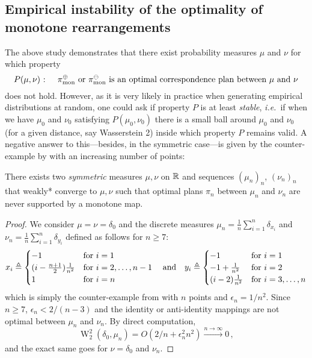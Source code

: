             \subsection{Empirical instability of the optimality of monotone rearrangements}
            \label{subsec:quadra1D_instability}
            The above study demonstrates that there exist probability measures $\mu$ and $\nu$ for which property
                \begin{equation*}
                    P(\mu,\nu)\text{ : }\quad \pi_\text{mon}^\oplus \text{ or } \pi_\text{mon}^\ominus \text{ is an optimal correspondence plan between }\mu\text{ and }\nu
                \end{equation*}
                does not hold. However, as it is very likely in practice when generating empirical distributions at random, one could ask if property $P$ is at least \emph{stable}, \textit{i.e.}~if when we have $\mu_0$ and $\nu_0$ satisfying $P(\mu_0,\nu_0)$ there is a small ball around $\mu_0$ and $\nu_0$ (for a given distance, say Wasserstein 2) inside which property $P$ remains valid. A negative answer to this---besides, in the symmetric case---is given by the counter-example by \cite{beinert2022assignment} with an increasing number of points:
                \begin{proposition}
                    \label{theo:no-stab}
                    There exists two \emph{symmetric} measures $\mu,\nu$ on $\mathbb{R}$ and sequences $(\mu_n)_n$, $(\nu_n)_n$ that weakly* converge to $\mu,\nu$ such that optimal plans $\pi_n$ between $\mu_n$ and $\nu_n$ are never supported by a monotone map.
                \end{proposition}
                \begin{proof}
                    We consider $\mu=\nu=\delta_0$ and the discrete measures $\mu_n=\frac{1}{n}\sum_{i=1}^n\delta_{x_i}$ and $\nu_n=\frac{1}{n}\sum_{i=1}^n\delta_{y_i}$ defined as follows for $n\geq7$:
                    $$x_{i}\triangleq \begin{cases}
                    -1 & \text{for }i=1 \\
                    (i-\frac{n+1}{2})\frac1{n^2} & \text{for }i=2,\dots,n-1 \\
                    1 & \text{for }i=n
                    \end{cases}\quad \text{and}\quad y_{i}\triangleq \begin{cases}
                    -1 & \text{for }i=1 \\
                    -1+\frac1{n^2} & \text{for }i=2 \\
                    (i-2)\frac1{n^2} & \text{for }i=3,\dots ,n
                    \end{cases}$$
                    which is simply the counter-example from \cite{beinert2022assignment} with $n$ points and $\epsilon_n=1/n^2$. Since $n\geq7$, $\epsilon_n<2/(n-3)$ and the identity or anti-identity mappings are not optimal between $\mu_n$ and $\nu_n$.
                By direct computation,
                $$\operatorname{W}_2^2(\delta_0,\mu_n)= O(2/n+\epsilon_n^2n^2)\xrightarrow[]{n\to\infty}0\,,$$
                and the exact same goes for $\nu=\delta_0$ and $\nu_n$.
                \end{proof}
